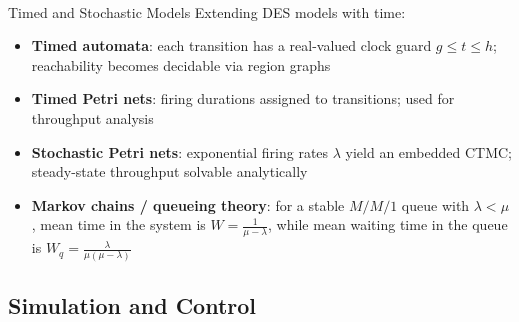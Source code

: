 \begin{v3topic}{Timed and Stochastic Models}
    Extending DES models with time\textsuperscript{\cite[][pp.~250--280]{cassandrasIntroductionDiscreteEvent2009}}:
    \begin{itemize}
        \item \textbf{Timed automata}: each transition has a real-valued clock guard $g \leq t \leq h$; reachability becomes decidable via region graphs
        \item \textbf{Timed Petri nets}: firing durations assigned to transitions; used for throughput analysis
        \item \textbf{Stochastic Petri nets}: exponential firing rates $\lambda$ yield an embedded CTMC; steady-state throughput solvable analytically
        \item \textbf{Markov chains / queueing theory}: for a stable $M/M/1$ queue with $\lambda<\mu$, mean time in the system is $W=\frac{1}{\mu-\lambda}$, while mean waiting time in the queue is $W_q=\frac{\lambda}{\mu(\mu-\lambda)}$
    \end{itemize}
\end{v3topic}

\subsection{Simulation and Control}

